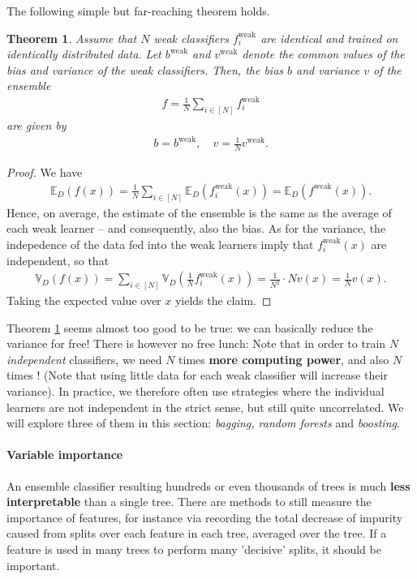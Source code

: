 \documentclass{article}
\newcommand{\erw}{\mathbb{E}} %
\newtheorem{theorem}{Theorem}
\begin{document}
The following simple but far-reaching theorem holds.
\begin{theorem} \label{th:ensemble}
    Assume that $N$ weak classifiers $f_i^{\mathrm{weak}}$ are identical and trained on identically distributed data. Let $b^{\mathrm{weak}}$ and $v^{\mathrm{weak}}$ denote the common values of the bias and variance of the weak classifiers. Then, the bias $b$ and variance $v$ of the ensemble 
    \begin{align*}
        f = \frac{1}{N} \sum_{i \in [N]}f_i^{\mathrm{weak}}
    \end{align*}
    are given by
    \begin{align*}
        b = b^{\mathrm{weak}}, \quad v = \frac{1}{N}v^{\mathrm{weak}}.
    \end{align*}
\end{theorem}
\begin{proof}
    We have 
\begin{align*}
   \erw_D(f(x)) = \frac{1}{N}\sum_{i\in [N]}\erw_D(f_i^{\mathrm{weak}}(x)) = \erw_D(f^{\mathrm{weak}}(x)).
\end{align*}
Hence, on average, the estimate of the ensemble is the same as the average of each weak learner -- and consequently, also the bias. As for the variance, the indepedence of the data fed into the weak learners imply that $f_i^\mathrm{weak}(x)$ are independent, so that
\begin{align*}
    \mathbb{V}_D(f(x)) = \sum_{i\in [N]}\mathbb{V}_D(\tfrac{1}{N}f_i^{\mathrm{weak}}(x)) = \frac{1}{N^2} \cdot N v(x) = \frac{1}{N}v(x).
\end{align*}
Taking the expected value over $x$ yields the claim.
\end{proof}
Theorem \ref{th:ensemble} seems almost too good to be true: we can basically reduce the variance for free! There is however no free lunch: Note that in order to train $N$ \emph{independent} classifiers, we need $N$ times \textbf{more computing power}, and also $N$ times ! (Note that using little data for each weak classifier will increase their variance). In practice, we therefore often use strategies where the individual learners are not independent in the strict sense, but still quite uncorrelated. We will explore three of them in this section: \emph{bagging, random forests} and \emph{boosting}.

\paragraph{Variable importance} An ensemble classifier resulting hundreds or even thousands of trees is much \textbf{less interpretable} than a single tree. There are methods to still measure the importance of features, for instance via recording the total decrease of impurity caused from splits over each feature in each tree, averaged over the tree. If a feature is used in many trees to perform many 'decisive' splits, it should be important.
\end{document}
